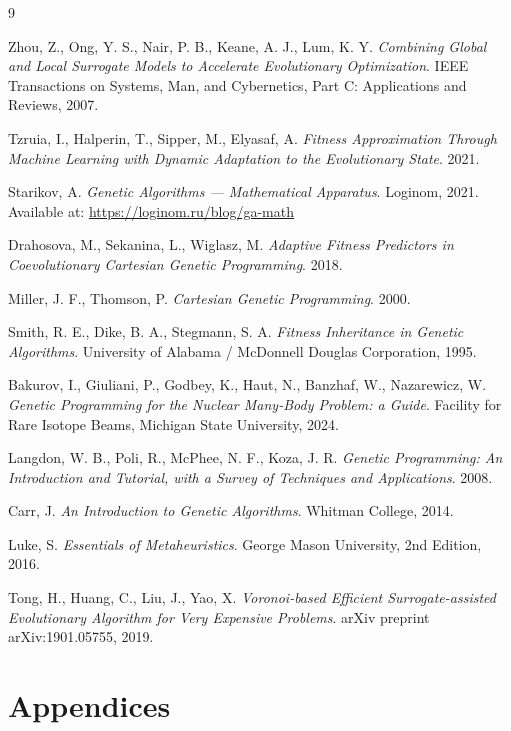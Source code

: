 \documentclass[12pt,a4paper]{report}
\begin{document}
\begin{thebibliography}{9}

Zhou, Z., Ong, Y. S., Nair, P. B., Keane, A. J., Lum, K. Y.
\emph{Combining Global and Local Surrogate Models to Accelerate Evolutionary Optimization}.
IEEE Transactions on Systems, Man, and Cybernetics, Part C: Applications and Reviews, 2007.

Tzruia, I., Halperin, T., Sipper, M., Elyasaf, A. 
\emph{Fitness Approximation Through Machine Learning with Dynamic Adaptation to the Evolutionary State}. 2021.

Starikov, A. 
\emph{Genetic Algorithms — Mathematical Apparatus}. Loginom, 2021. 
Available at: \url{https://loginom.ru/blog/ga-math}

Drahosova, M., Sekanina, L., Wiglasz, M. 
\emph{Adaptive Fitness Predictors in Coevolutionary Cartesian Genetic Programming}. 2018.

Miller, J. F., Thomson, P. 
\emph{Cartesian Genetic Programming}. 2000.

Smith, R. E., Dike, B. A., Stegmann, S. A. 
\emph{Fitness Inheritance in Genetic Algorithms}. University of Alabama / McDonnell Douglas Corporation, 1995.

Bakurov, I., Giuliani, P., Godbey, K., Haut, N., Banzhaf, W., Nazarewicz, W.
\emph{Genetic Programming for the Nuclear Many-Body Problem: a Guide}. 
Facility for Rare Isotope Beams, Michigan State University, 2024.

Langdon, W. B., Poli, R., McPhee, N. F., Koza, J. R.
\emph{Genetic Programming: An Introduction and Tutorial, with a Survey of Techniques and Applications}.
2008.

Carr, J.
\emph{An Introduction to Genetic Algorithms}.
Whitman College, 2014.

Luke, S.
\emph{Essentials of Metaheuristics}. George Mason University, 2nd Edition, 2016.

Tong, H., Huang, C., Liu, J., Yao, X.
\emph{Voronoi-based Efficient Surrogate-assisted Evolutionary Algorithm for Very Expensive Problems}.
arXiv preprint arXiv:1901.05755, 2019.

\end{thebibliography}

\appendix
\chapter{Appendices}
\label{chap:appendices}
\end{document}
